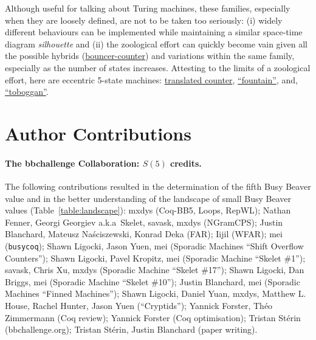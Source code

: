 \documentclass[a4paper,british]{article}
\theoremstyle{definition} %
\numberwithin{equation}{section}
\theoremstyle{definition} %
\newcommand{\CoqBB}{Coq-BB5\xspace}
\begin{document}
Although useful for talking about Turing machines, these families, especially when they are loosely defined, are not to be taken too seriously: (i) widely different behaviours can be implemented while maintaining a similar space-time diagram \textit{silhouette} and (ii) the zoological effort can quickly become vain given all the possible hybrids (\eg \href{https://bbchallenge.org/1RB---_1LC1RE_0RD0LC_1LB1LA_0RA1RE}{bouncer-counter}) and variations within the same family, especially as the number of states increases. Attesting to the limits of a zoological effort, here are eccentric 5-state machines: \href{https://bbchallenge.org/1RB0RA_1LC0LD_1RE1RD_1LA1LB_---1RC}{translated counter}, \href{https://bbchallenge.org/1RB0RD_1LC1LB_1RA0LB_0RE1RD_---1RA}{``fountain''}, and, \href{https://bbchallenge.org/1RB0RC_0LC---_1RD1RC_0LE1RA_1RD1LE}{``toboggan''}.








\appendix
\newpage
\section{Author Contributions}\label{app:contribs}

\paragraph{The bbchallenge Collaboration: $S(5)$ credits.} The following contributions resulted in the determination of the fifth Busy Beaver value and in the better understanding of the landscape of small Busy Beaver values (Table~\ref{table:landscape}): mxdys (\CoqBB, Loops, RepWL); Nathan Fenner, Georgi Georgiev a.k.a~Skelet, savask, mxdys (NGramCPS); Justin Blanchard, Mateusz Naściszewski, Konrad Deka (FAR); Iijil (WFAR); mei (\texttt{busycoq}); Shawn Ligocki, Jason Yuen, mei (Sporadic Machines ``Shift Overflow Counters''); Shawn Ligocki, Pavel Kropitz, mei (Sporadic Machine ``Skelet \#1''); savask, Chris Xu, mxdys (Sporadic Machine ``Skelet \#17''); Shawn Ligocki, Dan Briggs, mei (Sporadic Machine ``Skelet \#10''); Justin Blanchard, mei (Sporadic Machines ``Finned Machines''); Shawn Ligocki, Daniel Yuan, mxdys, Matthew L. House, Rachel Hunter, Jason Yuen (``Cryptids''); Yannick Forster, Théo Zimmermann (Coq review); Yannick Forster (Coq optimisation); Tristan Stérin (bbchallenge.org); Tristan Stérin, Justin Blanchard (paper writing).
\end{document}
